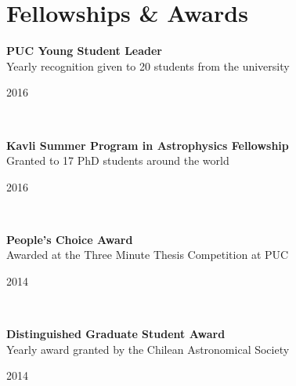 \documentclass[11pt, a4paper]{article} %
\begin{document}
\section*{Fellowships \& Awards}
\begin{minipage}[t]{0.7\textwidth}
\begin{flushleft}%
  \setlength{\leftskip}{0.2cm}%
\textbf{PUC Young Student Leader}\\
Yearly recognition given to 20 students from the university
\end{flushleft}
\end{minipage}
\begin{minipage}[t]{0.3\textwidth}
\hfill 2016
\end{minipage}\\

\begin{minipage}[t]{0.7\textwidth}
\begin{flushleft}%
  \setlength{\leftskip}{0.2cm}%
\textbf{Kavli Summer Program in Astrophysics Fellowship}\\
Granted to 17 PhD students around the world
\end{flushleft}
\end{minipage}
\begin{minipage}[t]{0.3\textwidth}
\hfill 2016
\end{minipage}\\

\begin{minipage}[t]{0.7\textwidth}
\begin{flushleft}%
  \setlength{\leftskip}{0.2cm}%
\textbf{People's Choice Award}\\
 Awarded at the Three Minute Thesis\textsuperscript{\textregistered} Competition at PUC
 \end{flushleft}
\end{minipage}
\begin{minipage}[t]{0.3\textwidth}
\hfill 2014
\end{minipage}\\

\begin{minipage}[t]{0.7\textwidth}
\begin{flushleft}%
  \setlength{\leftskip}{0.2cm}%
\textbf{Distinguished Graduate Student Award}\\
 Yearly award granted by the Chilean Astronomical Society
 \end{flushleft}
\end{minipage}
\begin{minipage}[t]{0.3\textwidth}
\hfill 2014
\end{minipage}\\
\end{document}
